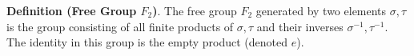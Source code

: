 \documentclass[preview]{standalone}
\begin{document}
\begin{center}
\textbf{Definition (Free Group $F_2$)}. The free group $F_2$ generated by two elements $\sigma, \tau$ is the group consisting of all finite products of $\sigma, \tau$ and their inverses $\sigma^{-1}, \tau^{-1}$. The identity in this group is the empty product (denoted $e$).
\end{center}
\end{document}
